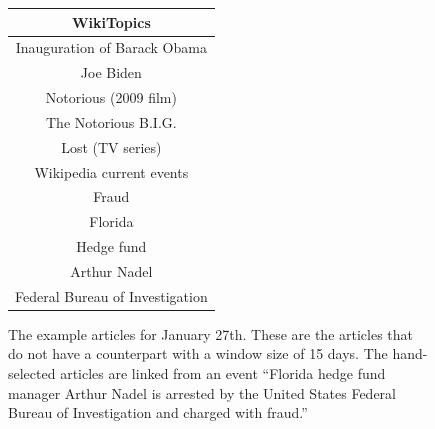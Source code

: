 \documentclass[11pt]{article}
\newcommand{\war}[1]{{\sf\small #1}}
\begin{document}
\begin{figure}
\centering
\begin{tabular}{|c|}
\hline
WikiTopics \\
\hline
\war{Inauguration of Barack Obama} \\
\war{Joe Biden} \\
\war{Notorious (2009 film)} \\
\war{The Notorious B.I.G.} \\
\war{Lost (TV series)} \\
\hline
Wikipedia current events \\
\hline
\war{Fraud} \\
\war{Florida} \\
\war{Hedge fund} \\
\war{Arthur Nadel} \\
\war{Federal Bureau of Investigation} \\
\hline
\end{tabular}
\caption{ The example articles for January 27th. These are the articles that do not have a counterpart with a window size of 15 days. The hand-selected articles are linked from an event ``Florida hedge fund manager Arthur Nadel is arrested by the United States Federal Bureau of Investigation and charged with fraud.'' \\ }
\label{fig:comparison-articles}
\end{figure}


\end{document}
